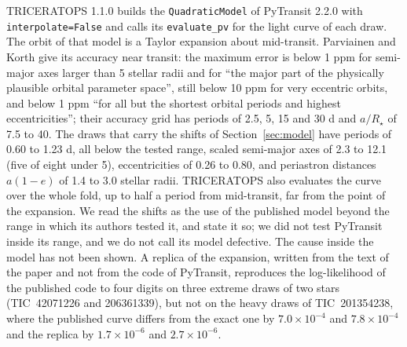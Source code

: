 \documentclass[11pt]{article}
\begin{document}
TRICERATOPS 1.1.0 builds the \texttt{QuadraticModel} of PyTransit 2.2.0 with \texttt{interpolate=False} and calls its \texttt{evaluate\_pv} for the light curve of each draw. The orbit of that model is a Taylor expansion about mid-transit. Parviainen and Korth \cite{parviainen2020} give its accuracy near transit: the maximum error is below 1 ppm for semi-major axes larger than 5 stellar radii and for ``the major part of the physically plausible orbital parameter space'', still below 10 ppm for very eccentric orbits, and below 1 ppm ``for all but the shortest orbital periods and highest eccentricities''; their accuracy grid has periods of 2.5, 5, 15 and 30 d and $a/R_\star$ of 7.5 to 40. The draws that carry the shifts of Section~\ref{sec:model} have periods of 0.60 to 1.23 d, all below the tested range, scaled semi-major axes of 2.3 to 12.1 (five of eight under 5), eccentricities of 0.26 to 0.80, and periastron distances $a(1-e)$ of 1.4 to 3.0 stellar radii. TRICERATOPS also evaluates the curve over the whole fold, up to half a period from mid-transit, far from the point of the expansion. We read the shifts as the use of the published model beyond the range in which its authors tested it, and state it so; we did not test PyTransit inside its range, and we do not call its model defective. The cause inside the model has not been shown. A replica of the expansion, written from the text of the paper and not from the code of PyTransit, reproduces the log-likelihood of the published code to four digits on three extreme draws of two stars (TIC~42071226 and 206361339), but not on the heavy draws of TIC~201354238, where the published curve differs from the exact one by $7.0\times10^{-4}$ and $7.8\times10^{-4}$ and the replica by $1.7\times10^{-6}$ and $2.7\times10^{-6}$.
\end{document}
